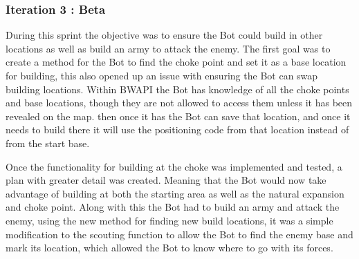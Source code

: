 \documentclass[journal]{IEEEtran}
\begin{document}
\subsubsection{Iteration 3 : Beta}
During this sprint the objective was to ensure the Bot could build in other locations as well as build an army to attack the enemy. The first goal was to create a method for the Bot to find the choke point and set it as a base location for building, this also opened up an issue with ensuring the Bot can swap building locations. Within BWAPI the Bot has knowledge of all the choke points and base locations, though they are not allowed to access them unless it has been revealed on the map. then once it has the Bot can save that location, and once it needs to build there it will use the positioning code from that location instead of from the start base. 

Once the functionality for building at the choke was implemented and tested, a plan with greater detail was created. Meaning that the Bot would now take advantage of building at both the starting area as well as the natural expansion and choke point. Along with this the Bot had to build an army and attack the enemy, using the new method for finding new build locations, it was a simple modification to the scouting function to allow the Bot to find the enemy base and mark its location, which allowed the Bot to know where to go with its forces.
\newline
\end{document}
